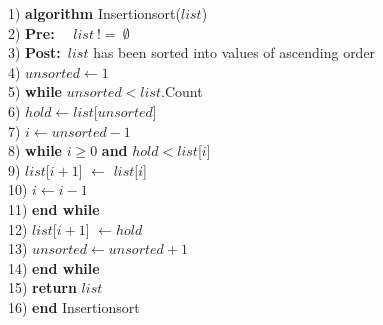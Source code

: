 \documentclass[10pt,oneside,a4paper]{report}
\begin{document}
\begin{tabbing}
1)  \textbf{alg}\= \textbf{orithm} Insertionsort($list$) \\
2)  \> \textbf{Pre:}~~ $list~!=~\emptyset$ \\
3)  \> \textbf{Post:}~$list$ has been sorted into values of ascending order \\
4)  \> $unsorted \leftarrow 1$ \\
5)  \> \textbf{whi}\= \textbf{le} $unsorted < list$.Count \\
6)  \> \> $hold \leftarrow list$[$unsorted$] \\
7)  \> \> $i \leftarrow unsorted - 1$ \\
8)  \> \> \textbf{whi}\= \textbf{le} $i \geq 0$ \textbf{and} $hold < list$[$i$] \\
9)  \> \> \> $list$[$i + 1$] $\leftarrow$ $list$[$i$] \\
10) \> \> \> $i \leftarrow i - 1$ \\
11) \> \> \textbf{end while} \\
12) \> \> $list$[$i+1$] $\leftarrow hold$ \\
13) \> \> $unsorted \leftarrow unsorted + 1$ \\
14) \> \textbf{end while} \\
15) \> \textbf{return} $list$ \\
16) \textbf{end} Insertionsort \\
\end{tabbing}
\end{document}
